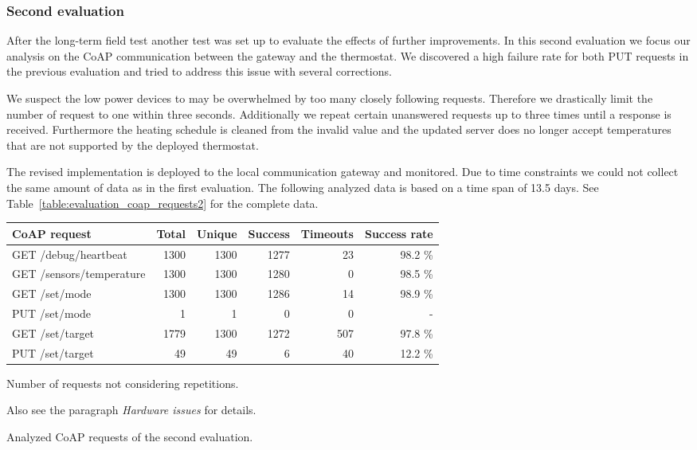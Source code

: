 
\subsubsection{Second evaluation}

After the long-term field test another test was set up to evaluate the effects of further improvements.
In this second evaluation we focus our analysis on the CoAP communication between the gateway and the thermostat.
We discovered a high failure rate for both PUT requests in the previous evaluation and tried to address this issue with several corrections.

We suspect the low power devices to may be overwhelmed by too many closely following requests.
Therefore we drastically limit the number of request to one within three seconds.
Additionally we repeat certain unanswered requests up to three times until a response is received.
Furthermore the heating schedule is cleaned from the invalid value and the updated server does no longer accept temperatures that are not supported by the deployed thermostat.

The revised implementation is deployed to the local communication gateway and monitored.
Due to time constraints we could not collect the same amount of data as in the first evaluation.
The following analyzed data is based on a time span of 13.5 days.
See Table~\ref{table:evaluation_coap_requests2} for the complete data.

\begin{threeparttable}[htbp]
	\centering
	\begin{tabular}{ l | r r r r r }
		\toprule
		CoAP request	& Total	& Unique\tnote{\textdagger}	& Success	& Timeouts	& Success rate \\
		\midrule
		GET /debug/heartbeat	& 1300	& 1300	& 1277	& 23	& 98.2 \% \\
		GET /sensors/temperature	& 1300	& 1300	& 1280	& 0	& 98.5 \% \\
		GET /set/mode	& 1300	& 1300	& 1286	& 14	& 98.9 \% \\
		PUT /set/mode	& 1	& 1	& 0	& 0	& - \\
		GET /set/target	& 1779	& 1300	& 1272	& 507	& 97.8 \% \\
		PUT /set/target	\tnote{\textasteriskcentered} & 49	& 49	& 6	& 40	& 12.2 \% \\
		\bottomrule
	\end{tabular}
	\begin{tablenotes}
		\footnotesize{
			\item[\textdagger] Number of requests not considering repetitions.
			\item[\textasteriskcentered] Also see the paragraph \emph{Hardware issues} for details.
		}
	\end{tablenotes}
	\caption{Analyzed CoAP requests of the second evaluation.}
	\label{table:evaluation_coap_requests2}
\end{threeparttable}

